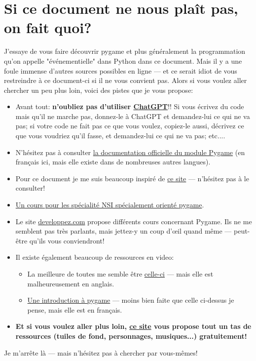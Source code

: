 \documentclass[11pt]{article}
\begin{document}
	\section{Si ce document ne nous plaît pas, on fait quoi?}
	J'essaye de vous faire découvrir pygame et plus généralement la programmation qu'on appelle "événementielle" dans Python dans ce document. Mais il y a une foule immense d'autres sources possibles en ligne --- et ce serait idiot de vous restreindre à ce document-ci si il ne vous convient pas. Alors si vous voulez aller chercher un peu plus loin, voici des pistes que je vous propose:
	\begin{itemize}
		\item Avant tout: \textbf{n'oubliez pas d'utiliser \href{https://chat.openai.com}{ChatGPT}}!! Si vous écrivez du code mais qu'il ne marche pas, donnez-le à ChatGPT et demandez-lui ce qui ne va pas; si votre code ne fait pas ce que vous voulez, copiez-le aussi, décrivez ce que vous voudriez qu'il fasse, et demandez-lui ce qui ne va pas; etc....
		\item N'hésitez pas à consulter \href{https://www.pygame.org/docs/}{la documentation officielle du module Pygame} (en français ici, mais elle existe dans de nombreuses autres langues).
		\item Pour ce document je me suis beaucoup inspiré de \href{https://nsimeyroneinc.github.io/NSI1_2022_2023/T08_Extras/3Pygame/01-Pygame_intro/}{ce site} --- n'hésitez pas à le consulter!
		\item \href{https://www.zonensi.fr/Miscellanees/Pygame/Base_pygame/#creation-dune-fenetre-graphique-et-boucle-devenements}{Un cours pour les spécialité NSI spécialement orienté pygame}.
		\item Le site \href{https://jeux.developpez.com/tutoriels/Pygame/}{developpez.com} propose différents cours concernant Pygame. Ils ne me semblent pas très parlants, mais jettez-y un coup d'\oe{}il quand même --- peut-être qu'ils vous conviendront!
		\item Il existe également beaucoup de ressources en video:
		\begin{itemize}
			\item La meilleure de toutes me semble être \href{https://www.youtube.com/watch?v=xxRhvyZXd8I&list=PLX5fBCkxJmm1fPSqgn9gyR3qih8yYLvMj}{celle-ci} --- mais elle est malheureusement en anglais.
			\item \href{https://www.youtube.com/watch?v=E1P6N5ZplWk&list=PL_Jc8T8naBEUuc0t-nGg9tuhwGfMUqz2H}{Une introduction à pygame} --- moins bien faite que celle ci-dessus je pense, mais elle est en français.
		\end{itemize}
		\item \textbf{Et si vous voulez aller plus loin, \href{https://realpython.com/platformer-python-arcade/}{ce site} vous propose tout un tas de ressources (tuiles de fond, personnages, musiques...) gratuitement!}
	\end{itemize}
	Je m'arrête là --- mais n'hésitez pas à chercher par vous-mêmes!
	
\end{document}
